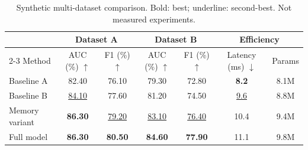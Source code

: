 \begin{table}[t]
\centering
\caption{Synthetic multi-dataset comparison. Bold: best; underline: second-best. Not measured experiments.}
\label{tab:demo-benchmark}
\begin{tabular}{|l|c|c|c|c|c|c|}
\hline
 & \multicolumn{2}{c}{Dataset A} & \multicolumn{2}{c}{Dataset B} & \multicolumn{2}{c}{Efficiency} \\
\cline{2-3} \cline{4-5} \cline{6-7}
Method & AUC (\%) $\uparrow$ & F1 (\%) $\uparrow$ & AUC (\%) $\uparrow$ & F1 (\%) $\uparrow$ & Latency (ms) $\downarrow$ & Params \\
\hline
Baseline A & 82.40 & 76.10 & 79.30 & 72.80 & \textbf{8.2} & 8.1M \\
Baseline B & \underline{84.10} & 77.60 & 81.20 & 74.50 & \underline{9.6} & 8.8M \\
Memory variant & \textbf{86.30} & \underline{79.20} & \underline{83.10} & \underline{76.40} & 10.4 & 9.4M \\
Full model & \textbf{86.30} & \textbf{80.50} & \textbf{84.60} & \textbf{77.90} & 11.1 & 9.8M \\
\hline
\end{tabular}
\end{table}
